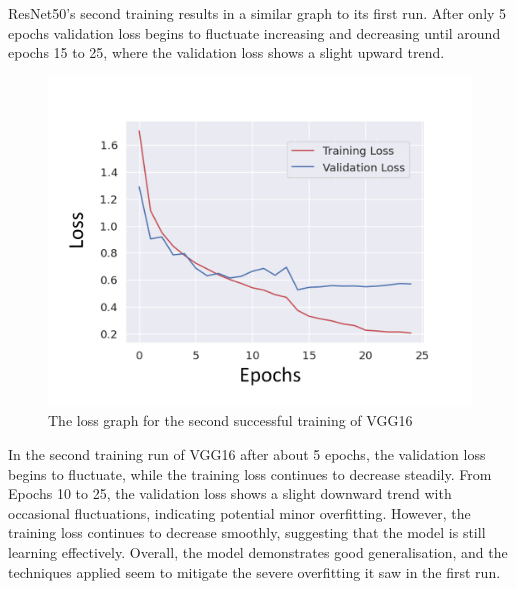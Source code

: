ResNet50's second training results in a similar graph to its first run. After only 5 epochs validation loss begins to fluctuate increasing and decreasing until around epochs 15 to 25, where the validation loss shows a slight upward trend.

\begin{figure}[H]
    \centering{}
    \includegraphics[scale=0.5]{fed_images/train_loss_VGG16_ofp_captioned.png}
    \caption{The loss graph for the second successful training of VGG16}
    \label{figure:loss_vgg16_ofp}
\end{figure}

In the second training run of VGG16 after about 5 epochs, the validation loss begins to fluctuate, while the training loss continues to decrease steadily. From Epochs 10 to 25, the validation loss shows a slight downward trend with occasional fluctuations, indicating potential minor overfitting. However, the training loss continues to decrease smoothly, suggesting that the model is still learning effectively. Overall, the model demonstrates good generalisation, and the techniques applied seem to mitigate the severe overfitting it saw in the first run.

